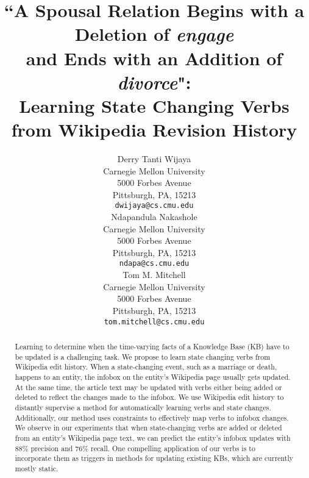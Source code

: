 \documentclass[11pt,a4paper]{article}
\title{``A Spousal Relation Begins with a Deletion of \textit{engage} \\and Ends with an Addition of \textit{divorce}": \\
Learning State Changing Verbs from Wikipedia Revision History}
\author{Derry Tanti Wijaya \\
  Carnegie Mellon University \\
  5000 Forbes Avenue \\
  Pittsburgh, PA, 15213 \\
  {\tt dwijaya@cs.cmu.edu} \\\And
   Ndapandula Nakashole \\
  Carnegie Mellon University \\
  5000 Forbes Avenue \\
  Pittsburgh, PA, 15213 \\
  {\tt ndapa@cs.cmu.edu} \\\And
  Tom M. Mitchell \\
  Carnegie Mellon University \\
  5000 Forbes Avenue \\
  Pittsburgh, PA, 15213 \\
  {\tt tom.mitchell@cs.cmu.edu} \\
  }
\date{}
\begin{document}
\maketitle


\begin{abstract}


Learning to determine when the time-varying facts of a Knowledge Base (KB) have to be updated is a challenging task.
We propose to learn state changing verbs from Wikipedia edit history. When a state-changing event,  such as a marriage or death,  happens to an entity, the  infobox on the entity's Wikipedia page usually gets  updated. At the same time, the  article text may be updated with verbs either being added or deleted to reflect the changes made to the infobox. We use Wikipedia edit history %
to distantly supervise a method for automatically learning verbs and state changes. Additionally, our method uses %
constraints
  to effectively map verbs to infobox changes. We observe in our experiments that when state-changing verbs are  added or deleted from an entity's Wikipedia  page text, we can predict the entity's infobox updates with 88\% precision and 76\% recall.
One compelling  application of our verbs is to incorporate them as triggers in methods for   updating existing KBs, which are currently mostly static.

\end{abstract}








\end{document}
